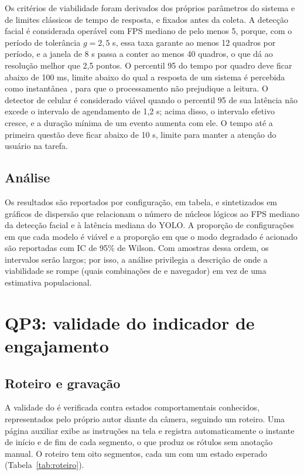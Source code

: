 Os critérios de viabilidade foram derivados dos próprios parâmetros do sistema e de limites clássicos de tempo de resposta, e fixados antes da coleta. A detecção facial é considerada operável com FPS mediano de pelo menos 5, porque, com o período de tolerância $g = 2{,}5$ s, essa taxa garante ao menos 12 quadros por período, e a janela de 8 s passa a conter ao menos 40 quadros, o que dá ao \fs resolução melhor que 2,5 pontos. O percentil 95 do tempo por quadro deve ficar abaixo de 100 ms, limite abaixo do qual a resposta de um sistema é percebida como instantânea \cite{Nie93}, para que o processamento não prejudique a leitura. O detector de celular é considerado viável quando o percentil 95 de sua latência não excede o intervalo de agendamento de 1,2 s; acima disso, o intervalo efetivo cresce, e a duração mínima de um evento aumenta com ele. O tempo até a primeira questão deve ficar abaixo de 10 s, limite para manter a atenção do usuário na tarefa.

\subsection{Análise}

Os resultados são reportados por configuração, em tabela, e sintetizados em gráficos de dispersão que relacionam o número de núcleos lógicos ao FPS mediano da detecção facial e à latência mediana do YOLO. A proporção de configurações em que cada modelo é viável e a proporção em que o modo degradado é acionado são reportadas com IC de 95\% de Wilson. Com amostras dessa ordem, os intervalos serão largos; por isso, a análise privilegia a descrição de onde a viabilidade se rompe (quais combinações de  e navegador) em vez de uma estimativa populacional.

\section{\label{sec:met-qp3}QP3: validade do indicador de engajamento}

\subsection{Roteiro e gravação}

A validade do \fs é verificada contra estados comportamentais conhecidos, representados pelo próprio autor diante da câmera, seguindo um roteiro. Uma página auxiliar exibe as instruções na tela e registra automaticamente o instante de início e de fim de cada segmento, o que produz os rótulos sem anotação manual. O roteiro tem oito segmentos, cada um com um estado esperado (Tabela~\ref{tab:roteiro}).

